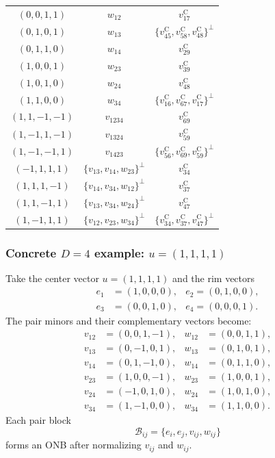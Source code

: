 \documentclass[%
  reprint,
  superscriptaddress,
  showkeys,
  amsmath,amssymb,
  aps,pra,
  longbibliography,
  floatfix,
  x11names
]{revtex4-2}
\begin{document}
\begin{table}[ht]
\begin{ruledtabular}
\begin{tabular}{ccc}
\hline
$(0,0,1,1)$ & $w_{12}$ & $v^{\mathrm{C}}_{17}$ \\
$(0,1,0,1)$ & $w_{13}$ & $\{v^{\mathrm{C}}_{45}, v^{\mathrm{C}}_{58}, v^{\mathrm{C}}_{48}\}^\perp$ \\
$(0,1,1,0)$ & $w_{14}$ & $v^{\mathrm{C}}_{29}$ \\
$(1,0,0,1)$ & $w_{23}$ & $v^{\mathrm{C}}_{39}$ \\
$(1,0,1,0)$ & $w_{24}$ & $v^{\mathrm{C}}_{48}$ \\
$(1,1,0,0)$ & $w_{34}$ & $\{v^{\mathrm{C}}_{16}, v^{\mathrm{C}}_{67}, v^{\mathrm{C}}_{17}\}^\perp$ \\
\hline
$(1,1,-1,-1)$ & $v_{1234}$ & $v^{\mathrm{C}}_{69}$ \\
$(1,-1,1,-1)$ & $v_{1324}$ & $v^{\mathrm{C}}_{59}$ \\
$(1,-1,-1,1)$ & $v_{1423}$ & $\{v^{\mathrm{C}}_{56}, v^{\mathrm{C}}_{69}, v^{\mathrm{C}}_{59}\}^\perp$ \\
\hline
$(-1,1,1,1)$ & $\{v_{13}, v_{14}, w_{23}\}^\perp$ & $v^{\mathrm{C}}_{34}$ \\
$(1,1,1,-1)$ & $\{v_{14}, v_{34}, w_{12}\}^\perp$ & $v^{\mathrm{C}}_{37}$ \\
$(1,1,-1,1)$ & $\{v_{13}, v_{34}, w_{24}\}^\perp$ & $v^{\mathrm{C}}_{47}$ \\
\hline
$(1,-1,1,1)$ & $\{v_{12}, v_{23}, w_{34}\}^\perp$ & $\{v^{\mathrm{C}}_{34}, v^{\mathrm{C}}_{37}, v^{\mathrm{C}}_{47}\}^\perp$ \\
\end{tabular}
\end{ruledtabular}
\end{table}





\subsubsection{Concrete \texorpdfstring{$D=4$}{D=4} example: \texorpdfstring{$u=(1,1,1,1)$}{u=(1,1,1,1)}}

Take the center vector $u=(1,1,1,1)$ and the rim vectors
\begin{align*}
e_1&=(1,0,0,0),& e_2 =(0,1,0,0),\\
e_3&=(0,0,1,0),& e_4 =(0,0,0,1).
\end{align*}
The pair minors and their complementary vectors become:
\begin{align*}
v_{12}&=(0,0,1,-1), & w_{12}&=(0,0,1,1),\\
v_{13}&=(0,-1,0,1), & w_{13}&=(0,1,0,1),\\
v_{14}&=(0,1,-1,0), & w_{14}&=(0,1,1,0),\\
v_{23}&=(1,0,0,-1), & w_{23}&=(1,0,0,1),\\
v_{24}&=(-1,0,1,0), & w_{24}&=(1,0,1,0),\\
v_{34}&=(1,-1,0,0), & w_{34}&=(1,1,0,0).
\end{align*}
Each pair block
\[
\mathcal{B}_{ij}=\{e_i, e_j, v_{ij}, w_{ij}\}
\]
forms an ONB after normalizing $v_{ij}$ and $w_{ij}$.
\end{document}
